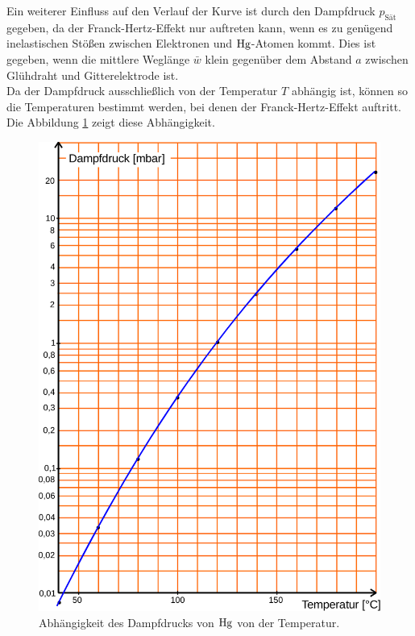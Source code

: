     Ein weiterer Einfluss auf den Verlauf der Kurve ist durch den Dampfdruck $p_\text{Sät}$ gegeben,
    da der Franck-Hertz-Effekt nur auftreten kann,
    wenn es zu genügend inelastischen Stößen zwischen Elektronen und $\ce{Hg}$-Atomen kommt.
    Dies ist gegeben,
    wenn die mittlere Weglänge $\bar{w}$ klein gegenüber dem Abstand $a$ zwischen Glühdraht und Gitterelektrode ist.\\
    Da der Dampfdruck ausschließlich von der Temperatur $T$ abhängig ist,
    können so die Temperaturen bestimmt werden,
    bei denen der Franck-Hertz-Effekt auftritt.\\
    Die Abbildung \ref{fig:dampfdruckkurve} zeigt diese Abhängigkeit.
    \begin{figure}[H]
        \centering
        \includegraphics[scale=0.5]{content/img/Abb_4.pdf}
        \caption{Abhängigkeit des Dampfdrucks von $\ce{Hg}$ von der Temperatur.}
        \label{fig:dampfdruckkurve}
    \end{figure}
